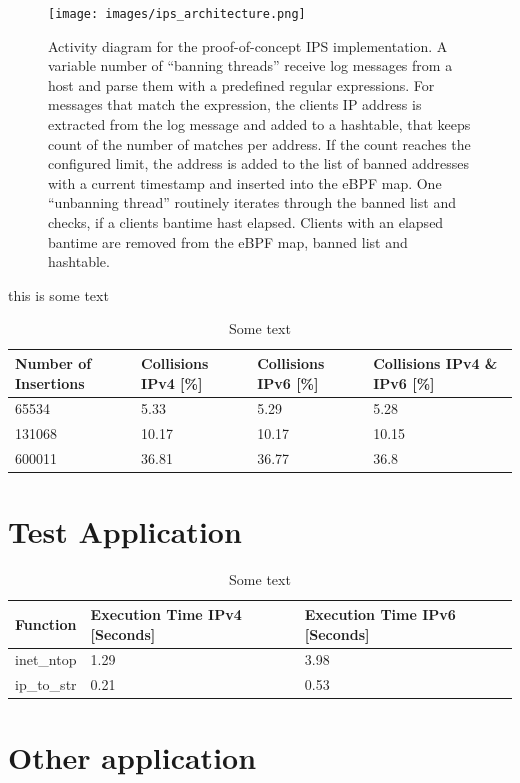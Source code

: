 \begin{figure}[p]
    \texttt{[image: images/ips\_architecture.png]}
    \caption[Simplefail2ban Architecture]{Activity diagram for the proof-of-concept IPS implementation. A variable number of ``banning threads'' receive log messages from a host and
    parse them with a predefined regular expressions. For messages that match the expression, the clients IP address is extracted from the log message and added to a hashtable, that keeps count of
    the number of matches per address. If the count reaches the configured limit, the address is added to the list of banned addresses with a current timestamp and inserted into the eBPF map. One ``unbanning
   thread'' routinely iterates through the banned list and checks, if a clients bantime hast elapsed. Clients with an elapsed bantime are removed from the eBPF map, banned list and hashtable.}
   \label{fig:meta_architecture}
\end{figure}

\begin{algorithm}[h!]
    
    \label{alg:ip_hashtable}
    \caption[IP Hashtable]{this is some text}
\end{algorithm}

\begin{table}[h!]
    \label{tab:hash_col}
    \centering
    \small
    \begin{tabular}{llll}
        \toprule
        \textbf{Number of Insertions} & \textbf{Collisions IPv4 [\%]} & \textbf{Collisions IPv6 [\%]} & \textbf{Collisions IPv4 \& IPv6 [\%]}\\ \midrule 
        65534 & 5.33 & 5.29 & 5.28 \\ \midrule
        131068 & 10.17 & 10.17 & 10.15 \\ \midrule
        600011 & 36.81 & 36.77 & 36.8 \\
        \bottomrule
    \end{tabular}
    \caption[Hash Collisions]{Some text}
\end{table}

\section{Test Application}

\begin{table}[h!]
    \label{tab:ip_str}
    \centering
    \small
    \begin{tabular}{lll}
        \toprule
        \textbf{Function} & \textbf{Execution Time IPv4 [Seconds]} & \textbf{Execution Time IPv6 [Seconds]} \\ \midrule 
        inet\_ntop & 1.29 & 3.98 \\ \midrule
        ip\_to\_str & 0.21 & 0.53 \\ 
        \bottomrule
    \end{tabular}
    \caption[IP String Conversion]{Some text}
\end{table}


\section{Other application}



